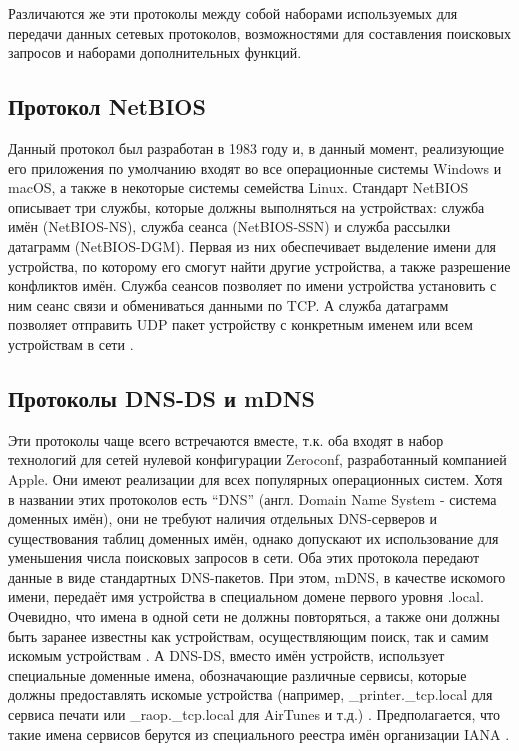 
Различаются же эти протоколы между собой наборами используемых для передачи данных сетевых протоколов, возможностями для составления поисковых запросов и наборами дополнительных функций.

\subsection{Протокол NetBIOS}
Данный протокол был разработан в 1983 году и, в данный момент, реализующие его приложения по умолчанию входят во все операционные системы Windows и macOS, а также в некоторые системы семейства Linux.
Стандарт NetBIOS описывает три службы, которые должны выполняться на устройствах: служба имён (NetBIOS-NS), служба сеанса (NetBIOS-SSN) и служба рассылки датаграмм (NetBIOS-DGM).
Первая из них обеспечивает выделение имени для устройства, по которому его смогут найти другие устройства, а также разрешение конфликтов имён.
Служба сеансов позволяет по имени устройства установить с ним сеанс связи и обмениваться данными по TCP.
А служба датаграмм позволяет отправить UDP пакет устройству с конкретным именем или всем устройствам в сети \cite{web:netbios}.

\subsection{Протоколы DNS-DS и mDNS}
Эти протоколы чаще всего встречаются вместе, т.к. оба входят в набор технологий для сетей нулевой конфигурации Zeroconf, разработанный компанией Apple.
Они имеют реализации для всех популярных операционных систем.
Хотя в названии этих протоколов есть "`DNS"' (англ. Domain Name System - система доменных имён), они не требуют наличия отдельных DNS-серверов и существования таблиц доменных имён, однако допускают их использование для уменьшения числа поисковых запросов в сети.
Оба этих протокола передают данные в виде стандартных DNS-пакетов.
При этом, mDNS, в качестве искомого имени, передаёт имя устройства в специальном домене первого уровня .local.
Очевидно, что имена в одной сети не должны повторяться, а также они должны быть заранее известны как устройствам, осуществляющим поиск, так и самим искомым устройствам \cite{web:dns-ds,web:mdns}.
А DNS-DS, вместо имён устройств, использует специальные доменные имена, обозначающие различные сервисы, которые должны предоставлять искомые устройства (например, {\_}printer.{\_}tcp.local для сервиса печати или {\_}raop.{\_}tcp.local для AirTunes и т.д.) \cite{web:dns-ds, book:zero-conf-guide}.
Предполагается, что такие имена сервисов берутся из специального реестра имён организации IANA \cite{web:iana-dns-ds}.


